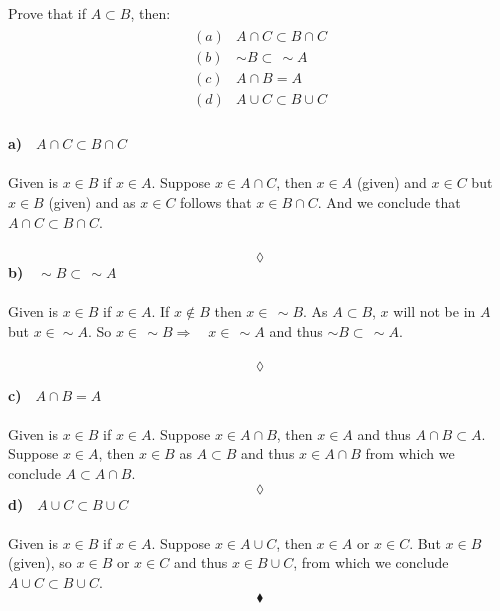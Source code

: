 \subsection{}
\begin{tcolorbox}
Prove that if $A\subset B$, then:
\begin{align*}
\begin{array}{ll}
(a)&A\cap C \subset B \cap C\\
(b)& \sim B \subset \, \sim A\\
(c) &A \cap B = A\\
(d) &A \cup C \subset B\cup C\\
\end{array}
\end{align*}
\end{tcolorbox}
\textbf{a)}$\quad A\cap C \subset B \cap C $\\\\
Given is $x\in B$ if $x \in A$. Suppose $x \in A\cap C$, then $x \in A$ (given) and $x \in C$ but $x \in B$ (given) and as $x \in C$ follows that $x \in B\cap C$. And we conclude that $A\cap C \subset B\cap C$. \\\\
$$\lozenge$$
\textbf{b)}$\quad \sim B \subset \, \sim A$\\\\
Given is $x\in B$ if $x \in A$. If $x\not\in B$ then $x\in \, \sim B$. As $A\subset B$, $x$ will not be in $A$ but $x\in \sim A$. So $x\in \, \sim B \Rightarrow \quad x\in \, \sim A$ and thus $\sim B \subset \, \sim A$. \\\\
$$\lozenge$$

\textbf{c)}$\quad A \cap B = A$\\\\
Given is $x\in B$ if $x \in A$. Suppose $x \in A\cap B$, then $x \in A$ and thus $A\cap B \subset A$. Suppose $x \in A$, then $x \in B$ as $A\subset B$ and thus $x\in A\cap B$ from which we conclude $A \subset A\cap B$.
$$\lozenge$$
\textbf{d)}$\quad A \cup C \subset B\cup C$\\\\
Given is $x\in B$ if $x \in A$. Suppose $x \in A\cup C$, then $x \in A$ or $x\in C$. But $x\in B$ (given), so $x\in B$ or $x\in C$ and thus $x\in B\cup C$, from which we conclude $A\cup C \subset B\cup C$.
$$\blacklozenge$$
\newpage

